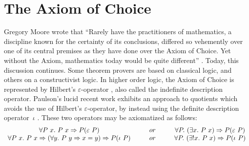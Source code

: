 \documentclass[envcountsame,runningheads]{llncs}
\begin{document}
%
\section{The Axiom of Choice}
%
\label{axiomofchoice}

Gregory Moore wrote that ``Rarely have the practitioners of mathematics,
a discipline known for the certainty of its conclusions, differed so vehemently
over one of its central premises as they have done over the Axiom of Choice.
Yet without the Axiom, mathematics today would be quite different''
\cite{Moore82}.
Today,
this discussion continues.
Some theorem provers are based on classical logic,
and others on
a constructivist logic.
In higher order logic, the Axiom of Choice is represented
by Hilbert's $\varepsilon$-operator \cite[\S4.4]{Lei69},
also called the indefinite description 
operator.
  Paulson's lucid recent work \cite{LP04} exhibits an approach to quotients
which avoids the use of Hilbert's $\varepsilon$-operator,
by
instead
using the definite description operator~$\iota$
\cite[\S 5.10]{NiPaWe02}.
These two operators may be axiomatized as follows:
%
$$\begin{array}{cp{3mm}cp{3mm}c}
\forall P\ x.\ P\ x \Rightarrow P (\varepsilon \ P) & & or & &
\forall P.\ (\exists x.\ P\ x) \Rightarrow P (\varepsilon \ P)
\\
\forall P\ x.\ P\ x \Rightarrow (\forall y.\ P\ y \Rightarrow x = y) \Rightarrow P (\iota \ P) & & or & &
\forall P.\ (\exists ! x.\ P\ x) \Rightarrow P (\iota \ P)
\end{array}
$$
\end{document}

